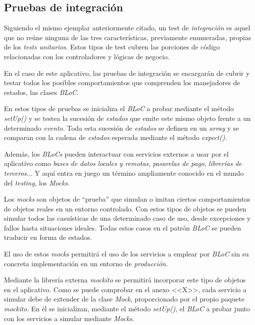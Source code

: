  \subsection{Pruebas de integración}
 Siguiendo el mismo ejemplar anteriormente citado, un test de \textit{integración} es aquel que no reúne ninguna
 de las tres características, previamente enumeradas, propias de los \textit{tests unitarios}.
 Estos tipos de test cubren las porciones de código relacionadas con los controladores y
 lógicas de negocio.

 En el caso de este aplicativo, las pruebas de integración se encargarán de cubrir y testar todos los posibles comportamientos
 que comprenden los manejadores de estados, las clases \textit{BLoC}.

 En estos tipos de pruebas se inicializa el \textit{BLoC} a probar mediante
 el método \textit{setUp()} y se testea la sucesión de \textit{estados} que emite este mismo
 objeto frente a un determinado \textit{evento}. Toda esta sucesión de \textit{estados} se definen en un \textit{array}
 y se comparan con la cadena de \textit{estados} esperada mediante el método \textit{expect()}.

 Además, los \textit{BLoCs} pueden interactuar con servicios externos a usar por el aplicativo como \textit{bases de datos locales y remotas},
 \textit{pasarelas de pago}, \textit{librerías de terceros}... Y aquí entra en juego un término ampliamente conocido en el mundo del  \textit{testing},
 los \textit{Mocks}.

 Los \textit{mocks} son objetos de ``prueba'' que simulan o imitan ciertos comportamientos
 de objetos reales en un entorno controlado. Con estos tipos de objetos se pueden simular
 todos las casuísticas de una determinado caso de uso, desde excepciones y fallos hasta situaciones
 ideales.
 Todas estos casos en el patrón \textit{BLoC} se pueden traducir en forma de estados.

 El uso de estos \textit{mocks} permitirá el uso de los servicios a emplear por \textit{BLoC} sin
 su concreta implementación en un entorno de \textit{producción}.
 
 Mediante la librería externa \textit{mockito} se permitirá incorporar este tipo de objetos
 en el aplicativo. Como se puede comprobar en el anexo <<X>>, cada servicio a simular debe de
 extender de la clase \textit{Mock}, proporcionado por el propio paquete \textit{mockito}.
 En él se inicializan, mediante el método \textit{setUp()}, el \textit{BLoC} a probar junto con
 los servicios a simular mediante \textit{Mocks}.

